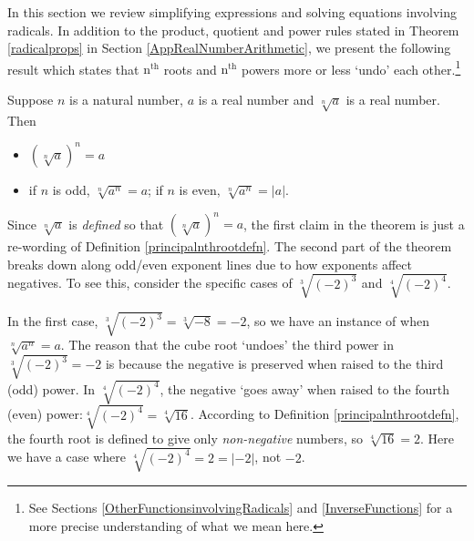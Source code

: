 

\setcounter{footnote}{0}

\label{AppRadEqus}

In this section we review simplifying expressions and solving equations involving radicals.  In addition to the product, quotient and power rules stated in Theorem \ref{radicalprops} in Section \ref{AppRealNumberArithmetic},  we present the following result which states that $\text{n}^{\text{th}}$ roots and $\text{n}^{\text{th}}$ powers more or less `undo' each other.\footnote{See Sections \ref{OtherFunctionsinvolvingRadicals} and \ref{InverseFunctions} for a more precise understanding of what we mean here.} 

\medskip

\colorbox{ResultColor}{\bbm

\begin{thm}\label{simplifyradicals} 
Suppose $n$ is a natural number, $a$ is a real number and $\sqrt[n]{a}$ is a real number.  Then

\begin{itemize}

\item $(\sqrt[n]{a})^{n} = a$

\item  if $n$ is odd, $\sqrt[n]{a^{n}} = a$; if $n$ is even, $\sqrt[n]{a^{n}} = |a|$.

\end{itemize}

\end{thm}

\ebm} 

\medskip

Since $\sqrt[n]{a}$ is \textit{defined} so that $(\sqrt[n]{a})^n = a$,  the first claim in the theorem is just a re-wording of  Definition \ref{principalnthrootdefn}.  The second part of the theorem breaks down along odd/even exponent lines due to how exponents affect negatives. To see this, consider the specific cases of $\sqrt[3]{(-2)^3}$ and $\sqrt[4]{(-2)^{4}}$.  

\medskip

In the first case,  $\sqrt[3]{(-2)^3} =\sqrt[3]{-8} = -2$, so we have an instance of when $\sqrt[n]{a^{n}} = a$.  The reason that the cube root `undoes' the third power in $\sqrt[3]{(-2)^3} = -2$ is because the negative is preserved when raised to the third (odd) power.  In  $\sqrt[4]{(-2)^{4}}$,  the negative `goes away' when raised to the fourth (even) power:$\sqrt[4]{(-2)^{4}} = \sqrt[4]{16}$.  According to Definition \ref{principalnthrootdefn}, the fourth root is defined to give only \textit{non-negative} numbers, so $\sqrt[4]{16} = 2$.  Here we have a case where $\sqrt[4]{(-2)^{4}} = 2 = |-2|$, not $-2$. 


